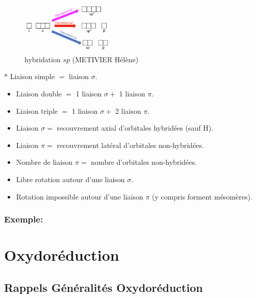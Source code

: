 \documentclass{article}
\begin{document}
\begin{figure}
    \centering
    \vspace{-1cm}
    \includegraphics[width=0.4\textwidth]{Fig/hybridation.png}
    \caption{hybridation $s p$ (METIVIER Hélène)}
    \label{fig:hybridation}
\end{figure}

    $\ast$ Liaison simple $=$ liaison $\sigma$. %

\begin{itemize}[label=$\ast$]
   \item Liaison double $=$ 1 liaison $\sigma +$ 1 liaison $\pi$.
    \item Liaison triple $=$ 1 liaison $\sigma +$ 2 liaison $\pi$.
    \item Liaison $\sigma =$ recouvrement axial d'orbitales hybridées (sauf H).
    \item Liaison $\pi =$ recouvrement latéral d'orbitales non-hybridées.
    \item Nombre de liaison $\pi =$ nombre d'orbitales non-hybridées.
    \item Libre rotation autour d'une liaison $\sigma$.
    \item Rotation impossible autour d'une liaison $\pi$ (y compris forment mésomères). 
\end{itemize}


\subsubsection{Exemple:}



\section{Oxydoréduction}\label{sec:oxydoréduction}

\subsection{Rappels Généralités Oxydoréduction}\label{subsec:rappels-oxydoreduction}
\end{document}

